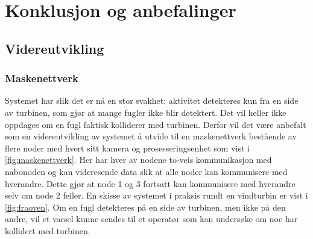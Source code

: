 \section{Konklusjon og anbefalinger}
\label{sec:konklusjon}


\subsection{Videreutvikling}

\subsubsection{Maskenettverk}

Systemet har slik det er nå en stor svakhet: aktivitet detekteres kun fra en side av turbinen, som gjør at mange fugler ikke blir detektert. 
Det vil heller ikke oppdages om en fugl faktisk kolliderer med turbinen. 
Derfor vil det være anbefalt som en videreutvikling av systemet å utvide til en maskenettverk bestående av flere noder med hvert sitt kamera og prosesseringsenhet som vist i  \autoref{fig:maskenettverk}. 
Her har hver av nodene to-veis kommunikasjon med nabonoden og kan videresende data slik at alle noder kan kommunisere med hverandre. 
Dette gjør at node 1 og 3 fortsatt kan kommunisere med hverandre selv om node 2 feiler. 
En skisse av systemet i praksis rundt en vindturbin er vist i \autoref{fig:fraoven}. 
Om en fugl detekteres på en side av turbinen, men ikke på den andre, vil et varsel kunne sendes til et operatør som kan undersøke om noe har kollidert med turbinen.

